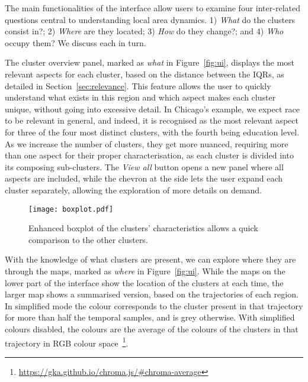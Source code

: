 The main functionalities of the interface allow users to examine four
inter-related questions central to understanding local area dynamics. 1)
\emph{What} do the clusters consist in?; 2) \emph{Where} are they located; 3)
\emph{How} do they change?; and 4) \emph{Who} occupy them? We discuss each in
turn.  

The cluster overview panel, marked as \emph{what} in Figure~\ref{fig:ui},
displays the most relevant aspects for each cluster, based on the distance
between the IQRs, as detailed in Section~\ref{sec:relevance}. This
feature allows the user to quickly understand what exists in this region and
which aspect makes each cluster unique, without going into excessive detail. In
Chicago's example, we expect race to be relevant in general, and indeed, it is
recognised as the most relevant aspect for three of the four most distinct
clusters, with the fourth being education level. As we increase the number of
clusters, they get more nuanced, requiring more than one aspect for their proper
characterisation, as each cluster is divided into its composing sub-clusters.
The \emph{View all} button opens a new panel where all aspects are included,
while the chevron at the side lets the user expand each cluster separately,
allowing the exploration of more details on demand.


\begin{figure}
    \centering 
    \texttt{[image: boxplot.pdf]}
    \caption{Enhanced boxplot of the clusters' characteristics allows a quick
    comparison to the other clusters.\label{fig:boxplot}}
\end{figure}


With the knowledge of what clusters are present, we can explore where they are
through the maps, marked as \emph{where} in Figure~\ref{fig:ui}. While the maps
on the lower part of the interface show the location of the clusters at each
time, the larger map shows a summarised version, based on the trajectories of
each region. In simplified mode the colour corresponds to the
cluster present in that trajectory for more than half the temporal samples, and
is grey otherwise. With simplified colours disabled, the colours are the average
of the colours of the clusters in that trajectory in RGB colour
space~\footnote{\url{https://gka.github.io/chroma.js/\#chroma-average}}.

